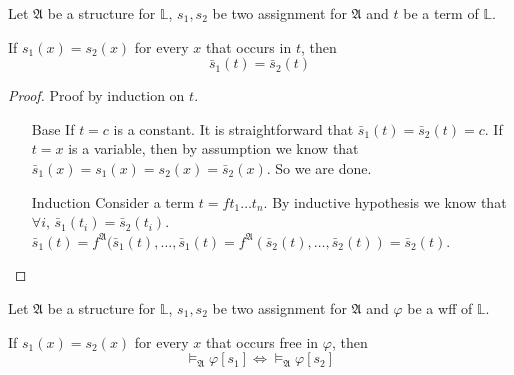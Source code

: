 \begin{lemma}
    \label{lem:LemmaForFreeOccurrenceThm}
    Let $\mathfrak{A}$ be a structure for $\mathbb{L}$, $s_1, s_2$ be two assignment for $\mathfrak{A}$ and $t$ be a term of $\mathbb{L}$.

    If $s_1(x)=s_2(x)$ for every $x$ that occurs in $t$, then
    \[ \bar{s}_1(t) = \bar{s}_2(t) \]
\end{lemma}
\begin{proof}
    Proof by induction on $t$.
    \begin{itemize}
        \item[Base] If $t=c$ is a constant. It is straightforward that $\bar{s}_1(t) = \bar{s}_2(t) = c$. If $t=x$ is a variable, then by assumption we know that $\bar{s}_1(x) = s_1(x) = s_2(x) = \bar{s}_2(x)$. So we are done.
        \item[Induction] Consider a term $t=ft_1\dots t_n$. By inductive hypothesis we know that $\forall i$, $\bar{s}_1(t_i) = \bar{s}_2(t_i)$. $\bar{s}_1(t) = f^{\mathfrak{A}}(\bar{s}_1(t), \dots, \bar{s}_1(t) = f^{\mathfrak{A}}(\bar{s}_2(t), \dots, \bar{s}_2(t)) = \bar{s}_2(t)$.
    \end{itemize}
\end{proof}

\begin{theorem}
    Let $\mathfrak{A}$ be a structure for $\mathbb{L}$, $s_1, s_2$ be two assignment for $\mathfrak{A}$ and $\varphi$ be a wff of $\mathbb{L}$.

    If $s_1(x)=s_2(x)$ for every $x$ that occurs free in $\varphi$, then
    \[ \vDash_{\mathfrak{A}}\varphi[s_1] \iff \vDash_{\mathfrak{A}}\varphi[s_2] \]
\end{theorem}

